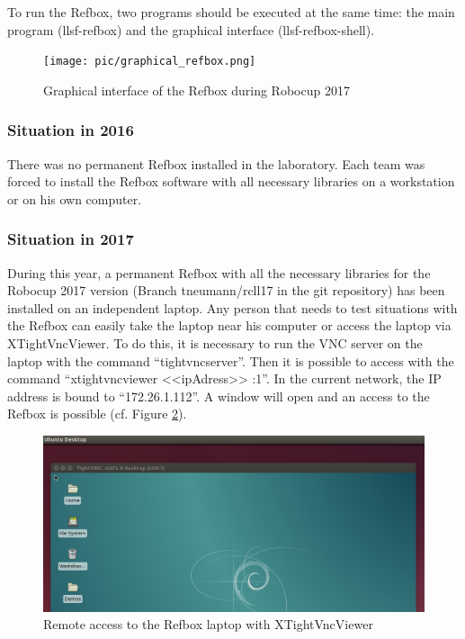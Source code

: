 To run the Refbox, two programs should be executed at the same time: the main program (llsf-refbox) and the graphical interface (llsf-refbox-shell). \\

\begin{figure}[!h]
\centering
\texttt{[image: pic/graphical\_refbox.png]}
\caption{Graphical interface of the Refbox during Robocup 2017}
\label{fig:graphicalRefbox}
\end{figure}

\subsubsection{Situation in 2016}

There was no permanent Refbox installed in the laboratory. Each team was forced to install the Refbox software with all necessary libraries on a workstation or on his own computer. \\

\subsubsection{Situation in 2017}

During this year, a permanent Refbox with all the necessary libraries for the Robocup 2017 version (Branch tneumann/rcll17 in the git repository) has been installed on an independent laptop. Any person that needs to test situations with the Refbox can easily take the laptop near his computer or access the laptop via XTightVncViewer. To do this, it is necessary to run the VNC server on the laptop with the command “tightvncserver”. Then it is possible to access with the command “xtightvncviewer <<ipAdress>> :1”.  In the current network, the IP address is bound to “172.26.1.112”. A window will open and an access to the Refbox is possible (cf. Figure \ref{fig:xtightvncviewer}).\\

\begin{figure}[!h]
\centering
\includegraphics[width=\linewidth]{pic/xtightvncviewer.png}
\caption{Remote access to the Refbox laptop with XTightVncViewer}
\label{fig:xtightvncviewer}
\end{figure}

